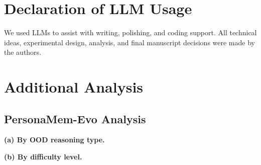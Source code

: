 \documentclass{llmxive}
\begin{document}
\section{Declaration of LLM Usage}
\label{llm_usage}
We used LLMs to assist with writing, polishing, and coding support. All technical ideas, experimental design, analysis, and final manuscript decisions were made by the authors.




\section{Additional Analysis}

\subsection{PersonaMem-Evo Analysis}

\begin{table}[!htbp]
\centering
\begin{minipage}[t]{0.56\linewidth}
\centering
{}
\vspace{1mm}

\textbf{(a) By OOD reasoning type.}
\end{minipage}
\hspace{0.035\linewidth}
\begin{minipage}[t]{0.38\linewidth}
\centering
{}
\vspace{1mm}

\textbf{(b) By difficulty level.}
\end{minipage}

\vspace{2mm}
\caption{PersonaMem-Evo performance breakdown by reasoning type and difficulty level using GPT-5.5.}
\label{tab:personamem_gpt55_breakdown}
\end{table}
\end{document}
